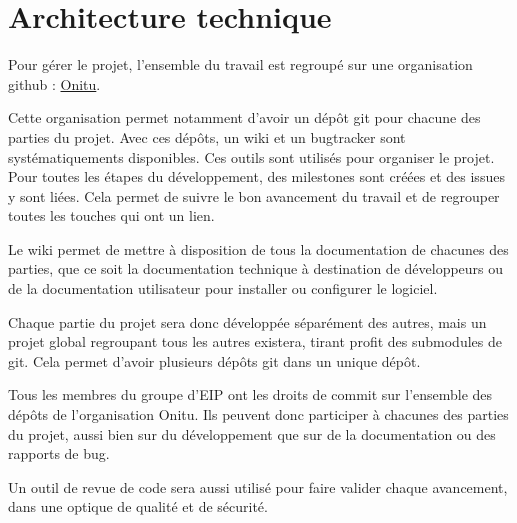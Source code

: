 \section{Architecture technique}

Pour gérer le projet, l'ensemble du travail est regroupé sur une organisation github : \href{https://github.com/onitu/}{Onitu}.

Cette organisation permet notamment d'avoir un dépôt git pour chacune des parties du projet. Avec ces dépôts, un wiki et un bugtracker sont systématiquements disponibles. Ces outils sont utilisés pour organiser le projet. Pour toutes les étapes du développement, des milestones sont créées et des issues y sont liées. Cela permet de suivre le bon avancement du travail et de regrouper toutes les touches qui ont un lien.

Le wiki permet de mettre à disposition de tous la documentation de chacunes des parties, que ce soit la documentation technique à destination de développeurs ou de la documentation utilisateur pour installer ou configurer le logiciel.

Chaque partie du projet sera donc développée séparément des autres, mais un projet global regroupant tous les autres existera, tirant profit des submodules de git. Cela permet d'avoir plusieurs dépôts git dans un unique dépôt.

Tous les membres du groupe d'EIP ont les droits de commit sur l'ensemble des dépôts de l'organisation Onitu. Ils peuvent donc participer à chacunes des parties du projet, aussi bien sur du développement que sur de la documentation ou des rapports de bug.

Un outil de revue de code sera aussi utilisé pour faire valider chaque avancement, dans une optique de qualité et de sécurité.
